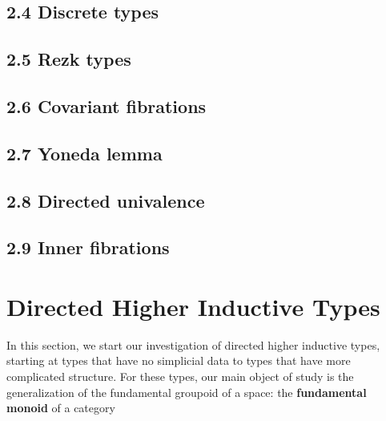 \documentclass{article}
\theoremstyle{named}
\theoremstyle{remark}
\theoremstyle{definition}
\begin{document}
\subsection*{2.4 Discrete types}

\setcounter{theorem}{0}

\subsection*{2.5 Rezk types}

\setcounter{theorem}{0}

\subsection*{2.6 Covariant fibrations}

\setcounter{theorem}{0}

\subsection*{2.7 Yoneda lemma}

\setcounter{theorem}{0}

\subsection*{2.8 Directed univalence}

\setcounter{theorem}{0}


\subsection*{2.9 Inner fibrations}

\setcounter{theorem}{0}



\section{Directed Higher Inductive Types}
In this section, we start our investigation of directed higher inductive types, starting at types that have no simplicial data
to types that have more complicated structure. For these types, our main object of study is the generalization of the fundamental groupoid 
of a space: the \textbf{fundamental monoid} of a category
\end{document}

